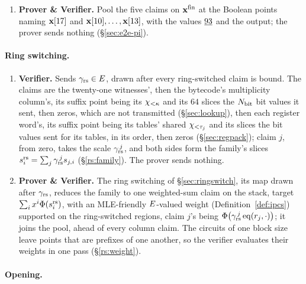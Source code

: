 \begin{enumerate}
\item \textbf{Prover \& Verifier.} Pool the five claims on $\mathbf{x}^{\mathrm{fin}}$ at the Boolean points naming $\mathbf{x}[17]$ and $\mathbf{x}[10],\dots,\mathbf{x}[13]$, with the values $\underline{93}$ and the output; the prover sends nothing (\S\ref{sec:e2e-pi}).
\end{enumerate}

\paragraph{Ring switching.}

\begin{enumerate}
\item \textbf{Verifier.} Sends $\gamma_{\mathrm{rs}}\in E$, drawn after every ring-switched claim is bound. The claims are the twenty-one witnesses', then the bytecode's multiplicity column's, its suffix point being its $\chi_{<\kappa}$ and its $64$ slices the $N_{\mathrm{bit}}$ bit values it sent, then zeros, which are not transmitted (\S\ref{sec:lookup}), then each register word's, its suffix point being its tables' shared $\chi_{<\tau_j}$ and its slices the bit values sent for its tables, in its order, then zeros (\S\ref{sec:regpack}); claim $j$, from zero, takes the scale $\gamma_{\mathrm{rs}}^{\,j}$, and both sides form the family's slices $s^{\mathrm{rs}}_{i}=\sum_j\gamma_{\mathrm{rs}}^{\,j}s_{j,i}$ (\S\ref{rs:family}). The prover sends nothing.
\item \textbf{Prover \& Verifier.} The ring switching of \S\ref{sec:ringswitch}, its map drawn after $\gamma_{\mathrm{rs}}$, reduces the family to one weighted-sum claim on the stack, target $\sum_ix^i\Phi(s^{\mathrm{rs}}_{i})$, with an MLE-friendly $E$-valued weight (Definition~\ref{def:ipcs}) supported on the ring-switched regions, claim $j$'s being $\Phi\bigl(\gamma_{\mathrm{rs}}^{\,j}\operatorname{eq}(r_j,\cdot)\bigr)$; it joins the pool, ahead of every column claim. The circuits of one block size leave points that are prefixes of one another, so the verifier evaluates their weights in one pass (\S\ref{rs:weight}).
\end{enumerate}

\paragraph{Opening.}

